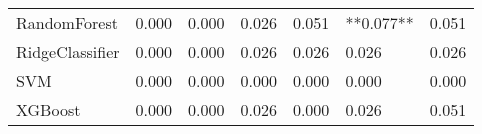 \begin{tabular}{lllllll}
                   RandomForest & 0.000 &                     0.000 &                 0.026 &                  0.051 &                               **0.077** &    0.051 \\
                RidgeClassifier & 0.000 &                     0.000 &                 0.026 &                  0.026 &                                   0.026 &    0.026 \\
                            SVM & 0.000 &                     0.000 &                 0.000 &                  0.000 &                                   0.000 &    0.000 \\
                        XGBoost & 0.000 &                     0.000 &                 0.026 &                  0.000 &                                   0.026 &    0.051 \\
\bottomrule
\end{tabular}

